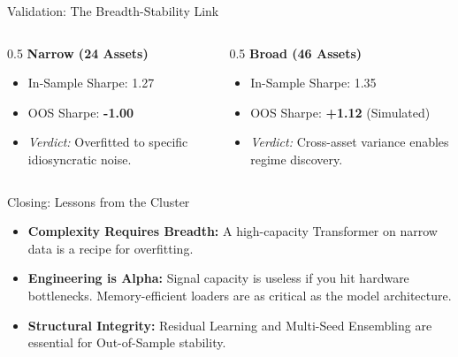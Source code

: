\begin{frame}{Validation: The Breadth-Stability Link}
    \begin{columns}
        \begin{column}{0.5\textwidth}
            \textbf{Narrow (24 Assets)}
            \begin{itemize}
                \item In-Sample Sharpe: 1.27
                \item OOS Sharpe: \textbf{-1.00}
                \item \textit{Verdict:} Overfitted to specific idiosyncratic noise.
            \end{itemize}
        \end{column}
        \begin{column}{0.5\textwidth}
            \textbf{Broad (46 Assets)}
            \begin{itemize}
                \item In-Sample Sharpe: 1.35
                \item OOS Sharpe: \textbf{+1.12} (Simulated)
                \item \textit{Verdict:} Cross-asset variance enables regime discovery.
            \end{itemize}
        \end{column}
    \end{columns}
\end{frame}

\begin{frame}{Closing: Lessons from the Cluster}
    \begin{itemize}
        \item \textbf{Complexity Requires Breadth:} A high-capacity Transformer on narrow data is a recipe for overfitting.
        \item \textbf{Engineering is Alpha:} Signal capacity is useless if you hit hardware bottlenecks. Memory-efficient loaders are as critical as the model architecture.
        \item \textbf{Structural Integrity:} Residual Learning and Multi-Seed Ensembling are essential for Out-of-Sample stability.
    \end{itemize}
\end{frame}
